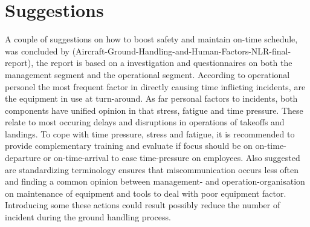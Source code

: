 \section{Suggestions}
    A couple of suggestions on how to boost safety and maintain on-time schedule, was concluded by (Aircraft-Ground-Handling-and-Human-Factors-NLR-final-report), the report is based on a investigation and questionnaires on both the management segment and the operational segment. According to operational personel the most frequent factor in directly causing time inflicting incidents, are the equipment in use at turn-around. As far personal factors to incidents, both components have unified opinion in that stress, fatigue and time pressure. These relate to most occuring delays and disruptions in operations of takeoffs and landings. To cope with time pressure, stress and fatigue, it is recommended to provide complementary training and evaluate if focus should be on on-time-departure or on-time-arrival to ease time-pressure on employees. Also suggested are standardizing terminology ensures that miscommunication occurs less often and finding a common opinion between management- and operation-organisation on maintenance of equipment and tools to deal with poor equipment factor. Introducing some these actions could result possibly reduce the number of incident during the ground handling process.

